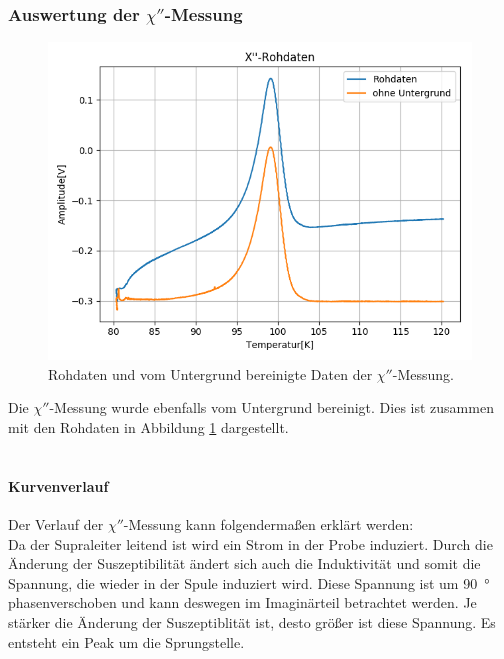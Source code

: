 \documentclass[12pt,a4paper]{article}
\begin{document}
\subsubsection{Auswertung der $\chi''$-Messung}
\begin{figure}[h]
\centering
\includegraphics[scale=0.8]{Bilder/Haupt_Supra/X2roh.png}
\caption{Rohdaten und vom Untergrund bereinigte Daten der $\chi''$-Messung.}
\label{fig:Supra_X2roh}
\end{figure}

Die $\chi''$-Messung wurde ebenfalls vom Untergrund bereinigt. Dies ist zusammen mit den Rohdaten in Abbildung \ref{fig:Supra_X2roh} dargestellt.\\
\\
\paragraph{Kurvenverlauf}
Der Verlauf der $\chi''$-Messung kann folgendermaßen erklärt werden:\\
Da der Supraleiter leitend ist wird ein Strom in der Probe induziert. Durch die Änderung der Suszeptibilität ändert sich auch die Induktivität und somit die Spannung, die wieder in der Spule induziert wird. Diese Spannung ist um \SI{90}{\degree} phasenverschoben und kann deswegen im Imaginärteil betrachtet werden. Je stärker die Änderung der Suszeptiblität ist, desto größer ist diese Spannung. Es entsteht ein Peak um die Sprungstelle.
\end{document}
